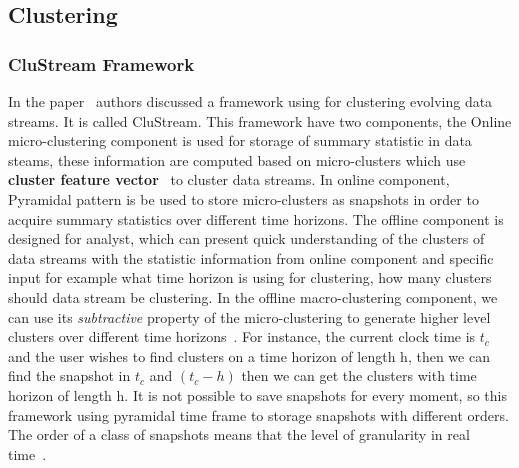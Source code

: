 \subsection{Clustering}
\subsubsection{CluStream Framework}
In the paper~\cite{aggarwal2003framework} authors discussed a framework using
for clustering evolving data streams. It is called CluStream. This framework
have two components, the Online micro-clustering component is used for storage
of summary statistic in data steams, these information are computed based on
micro-clusters which use \textbf{cluster feature vector}~\cite{zhang1996birch}
to cluster data streams. In online component, Pyramidal pattern is be used to
store micro-clusters as snapshots in order to acquire summary statistics over
different time horizons. The offline component is designed for analyst, which
can present quick understanding of the clusters of data streams with the
statistic information from online component and specific input for example what
time horizon is using for clustering, how many clusters should data stream be
clustering. In the offline macro-clustering component, we can use its
\emph{subtractive} property of the micro-clustering to generate higher level
clusters over different time horizons~\cite{aggarwal2003framework}. For
instance, the current clock time is $t_c$ and the user wishes to find clusters
on a time horizon of length h, then we can find the snapshot in $t_c$ and $(t_c-
h)$ then we can get the clusters with time horizon of length h. It is not
possible to save snapshots for every moment, so this framework using pyramidal
time frame to storage snapshots with different orders. The order of a class of
snapshots means that the level of granularity in real
time~\cite{aggarwal2003framework}.
